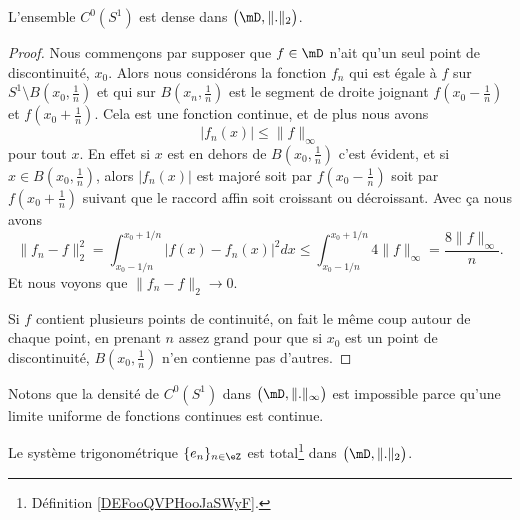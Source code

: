 \begin{lemma}   \label{LemVIwMsTC}
    L'ensemble \( C^0(S^1)\) est dense dans \( \big( \mD,\| . \|_2 \big)\).
\end{lemma}

\begin{proof}
    Nous commençons par supposer que \( f\in\mD\) n'ait qu'un seul point de discontinuité, \( x_0\). Alors nous considérons la fonction \( f_n\) qui est égale à \( f\) sur \( S^1\setminus B(x_0,\frac{1}{ n })\) et qui sur \( B(x_n,\frac{1}{ n })\) est le segment de droite joignant \( f(x_0-\frac{1}{ n })\) et \( f(x_0+\frac{1}{ n })\). Cela est une fonction continue, et de plus nous avons
    \begin{equation}
        | f_n(x) |\leq \| f \|_{\infty}
    \end{equation}
    pour tout \( x\). En effet si \( x\) est en dehors de \( B(x_0,\frac{1}{ n })\) c'est évident, et si \( x\in B(x_0,\frac{1}{ n })\), alors \( | f_n(x) |\) est majoré soit par \( f(x_0-\frac{1}{ n })\) soit par \( f(x_0+\frac{1}{ n })\) suivant que le raccord affin soit croissant ou décroissant. Avec ça nous avons
    \begin{equation}
        \| f_n-f \|_2^2=\int_{x_0-1/n}^{x_0+1/n}| f(x)-f_n(x) |^2dx\leq \int_{x_0-1/n}^{x_0+1/n}4\| f \|_{\infty}=\frac{ 8\| f \|_{\infty} }{ n }.
    \end{equation}
    Et nous voyons que \( \| f_n-f \|_2\to 0\).

    Si \( f\) contient plusieurs points de continuité, on fait le même coup autour de chaque point, en prenant \( n\) assez grand pour que si \( x_0\) est un point de discontinuité, \( B(x_0,\frac{1}{ n })\) n'en contienne pas d'autres.
\end{proof}

Notons que la densité de \( C^0(S^1)\) dans \( \big( \mD,\| . \|_{\infty} \big)\) est impossible parce qu'une limite uniforme de fonctions continues est continue.

\begin{theorem}
    Le système trigonométrique \( \{ e_n \}_{n\in \eZ}\) est total\footnote{Définition \ref{DEFooQVPHooJaSWyF}.} dans \( \big( \mD,\| . \|_2 \big)\).
\end{theorem}

